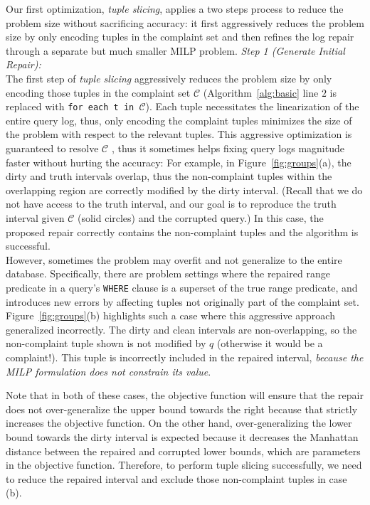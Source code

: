 Our first optimization, \emph{tuple slicing}, applies a two steps process to reduce the 
problem size without sacrificing accuracy: it
first aggressively reduces
the problem size by only encoding tuples in the complaint set and then refines the log repair 
through a separate but much smaller MILP problem. 
\noindent\textit{Step 1 (Generate Initial Repair):} \\
The first step of  \emph{tuple slicing} 
aggressively reduces the problem size by only encoding those 
tuples in the complaint set $\mathcal{C}$ (Algorithm~\ref{alg:basic} line $2$
is replaced with \texttt{for each t in $\mathcal{C}$}). 
Each tuple necessitates
the linearization of the entire query log, thus, only encoding the complaint tuples minimizes the 
size of the problem with respect to the relevant tuples. This aggressive optimization is guaranteed to resolve $\mathcal{C}$ , thus it sometimes helps
fixing query logs magnitude faster without hurting the accuracy: For example, in Figure~\ref{fig:groups}(a), the dirty and truth intervals overlap, thus the non-complaint tuples 
within the overlapping region are correctly modified by the dirty interval. 
(Recall that we do not have access to the truth interval, and our goal is to reproduce the 
truth interval given $\mathcal{C}$ (solid circles) and the corrupted query.) 
In this case, the proposed repair correctly contains the non-complaint tuples and the algorithm is successful.\\
\indent However, sometimes the problem may overfit 
and not generalize to the entire database.
Specifically, there are problem settings where the repaired range predicate in a query's \texttt{WHERE} clause is a superset of the true range predicate, and introduces new errors by affecting tuples not originally part of  the complaint set. 
Figure~\ref{fig:groups}(b) highlights such a case where this aggressive approach generalized incorrectly.
The dirty and clean intervals are non-overlapping, so the non-complaint tuple shown is not modified by $q$ (otherwise it would be a complaint!). This tuple is incorrectly included in the repaired interval, \emph{because the MILP formulation does not constrain its value}.

\indent Note that in both of these cases, the objective function will ensure that the repair
does not over-generalize the upper bound towards the right because that strictly increases the objective function.
On the other hand, over-generalizing the lower bound towards the dirty interval
is expected because it decreases the Manhattan distance between the repaired and corrupted lower bounds,
which are parameters in the objective function. Therefore, to perform tuple slicing successfully, we need to reduce the repaired interval and exclude those non-complaint tuples in case (b).  

